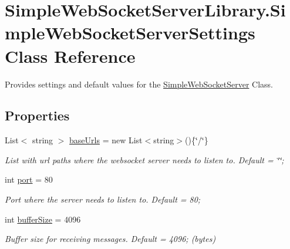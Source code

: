 \hypertarget{class_simple_web_socket_server_library_1_1_simple_web_socket_server_settings}{}\section{Simple\+Web\+Socket\+Server\+Library.\+Simple\+Web\+Socket\+Server\+Settings Class Reference}
\label{class_simple_web_socket_server_library_1_1_simple_web_socket_server_settings}


Provides settings and default values for the \mbox{\hyperlink{class_simple_web_socket_server_library_1_1_simple_web_socket_server}{Simple\+Web\+Socket\+Server}} Class.  


\subsection*{Properties}
\begin{DoxyCompactItemize}
\item 
List$<$ string $>$ \mbox{\hyperlink{class_simple_web_socket_server_library_1_1_simple_web_socket_server_settings_a75a76b265e2d7b35a6eb33bcbf38efb4}{base\+Urls}} = new List$<$string$>$()\{\char`\"{}/\char`\"{}\}
\begin{DoxyCompactList}\small\item\em List with url paths where the websocket server needs to listen to. Default = \char`\"{}\char`\"{}; \end{DoxyCompactList}\item 
int \mbox{\hyperlink{class_simple_web_socket_server_library_1_1_simple_web_socket_server_settings_a58a8ef37b983c6697c5a33cd44992fcd}{port}} = 80
\begin{DoxyCompactList}\small\item\em Port where the server needs to listen to. Default = 80; \end{DoxyCompactList}\item 
int \mbox{\hyperlink{class_simple_web_socket_server_library_1_1_simple_web_socket_server_settings_a4ef28355e14363a3884552e8b7fb9567}{buffer\+Size}} = 4096
\begin{DoxyCompactList}\small\item\em Buffer size for receiving messages. Default = 4096; (bytes) \end{DoxyCompactList}\end{DoxyCompactItemize}



